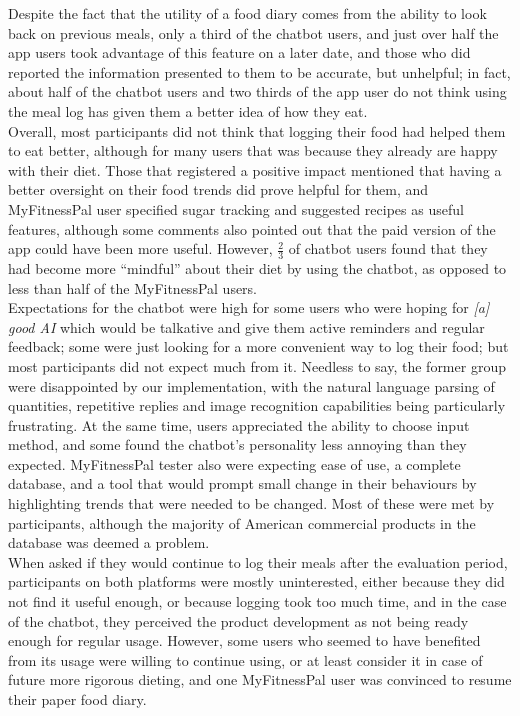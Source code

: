 Despite the fact that the utility of a food diary comes from the ability to look back on previous meals, only a third of the chatbot users, and just over half the app users took advantage of this feature on a later date, and those who did reported the information presented to them to be accurate, but unhelpful; in fact, about half of the chatbot users and two thirds of the app user do not think using the meal log has given them a better idea of how they eat. \\
Overall, most participants did not think that logging their food had helped them to eat better, although for many users that was because they already are happy with their diet. Those that registered a positive impact mentioned that having a better oversight on their food trends did prove helpful for them, and MyFitnessPal user specified sugar tracking and suggested recipes as useful features, although some comments also pointed out that the paid version of the app could have been more useful. However, $\frac{2}{3}$ of chatbot users found that they had become more ``mindful'' about their diet by using the chatbot, as opposed to less than half of the MyFitnessPal users. \\
Expectations for the chatbot were high for some users who were hoping for \textit{[a] good AI} which would be talkative and give them active reminders and regular feedback; some were just looking for a more convenient way to log their food; but most participants did not expect much from it. Needless to say, the former group were disappointed by our implementation, with the natural language parsing of quantities, repetitive replies and image recognition capabilities being particularly frustrating. At the same time, users appreciated the ability to choose input method, and some found the chatbot's personality less annoying than they expected. MyFitnessPal tester also were expecting ease of use, a complete database, and a tool that would prompt small change in their behaviours by highlighting trends that were needed to be changed. Most of these were met by participants, although the majority of American commercial products in the database was deemed a problem. \\
When asked if they would continue to log their meals after the evaluation period, participants on both platforms were mostly uninterested, either because they did not find it useful enough, or because logging took too much time, and in the case of the chatbot, they perceived the product development as not being ready enough for regular usage. However, some users who seemed to have benefited from its usage were willing to continue using, or at least consider it in case of future more rigorous dieting, and one MyFitnessPal user was convinced to resume their paper food diary. \\
